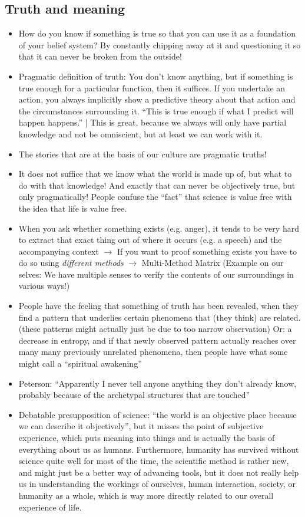 \documentclass[emulatestandardclasses]{scrartcl}
\begin{document}
\subsection{Truth and meaning}

\begin{itemize}
 \item How do you know if something is true so that you can use it as a foundation of your belief system? By constantly chipping away at it and questioning it so that it can never be broken from the outside! 
  \item Pragmatic definition of truth: You don't know anything, but if something is true enough for a particular function, then it suffices. If you undertake an action, you always implicitly show a predictive theory about that action and the circumstances surrounding it. "`This is true enough if what I predict will happen happens."' | This is great, because we always will only have partial knowledge and not be omniscient, but at least we can work with it.
  \item The stories that are at the basis of our culture are pragmatic truths! 
  \item It does not suffice that we know what the world is made up of, but what to do with that knowledge! And exactly that can never be objectively true, but only pragmatically! People confuse the "`fact"' that science is value free with the idea that life is value free. 
  \item When you ask whether something exists (e.g. anger), it tends to be very hard to extract that exact thing out of where it occurs (e.g. a speech) and the accompanying context $\rightarrow$ If you want to proof something exists you have to do so using \emph{different methods} $\rightarrow$ Multi-Method Matrix (Example on our selves: We have multiple senses to verify the contents of our surroundings in various ways!)
  \item People have the feeling that something of truth has been revealed, when they find a pattern that underlies certain phenomena that (they think) are related. (these patterns might actually just be due to too narrow observation) Or: a decrease in entropy, and if that newly observed pattern actually reaches over many many previously unrelated phenomena, then people have what some might call a "`spiritual awakening"'
  \item Peterson: "`Apparently I never tell anyone anything they don't already know, probably because of the archetypal structures that are touched"'
  \item Debatable presupposition of science: "`the world is an objective place because we can describe it objectively"', but it misses the point of subjective experience, which puts meaning into things and is actually the basis of everything about us as humans. Furthermore, humanity has survived without science quite well for most of the time, the scientific method is rather new, and might just be a better way of advancing tools, but it does not really help us in understanding the workings of ourselves, human interaction, society, or humanity as a whole, which is way more directly related to our overall experience of life.

\end{itemize}
\end{document}
